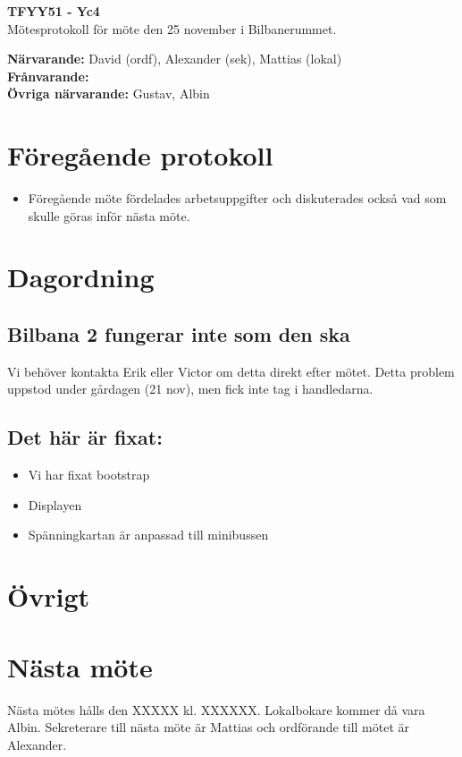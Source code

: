 \documentclass[11pt,a4paper]{article}
\begin{document}
    \begin{center}
        \textbf{\Large TFYY51 - Yc4} \\[0.2em]
        Mötesprotokoll för möte den 25 november i Bilbanerummet.
    \end{center}
    \vspace{1em}
    \textbf{Närvarande:} David (ordf), Alexander (sek), Mattias (lokal) \\[0.5em]
    \textbf{Frånvarande:}  \\[0.5em]  %
    \textbf{Övriga närvarande: }Gustav, Albin

    \section*{Föregående protokoll}
    \begin{itemize}
        \item Föregående möte fördelades arbetsuppgifter och diskuterades också vad som skulle göras inför nästa möte.\
    \end{itemize}

    \section*{Dagordning}
    \subsection*{Bilbana 2 fungerar inte som den ska}
	    Vi behöver kontakta Erik eller Victor om detta direkt efter mötet. Detta problem uppstod under gårdagen (21 nov), men fick inte tag i handledarna.
	    \subsection*{Det här är fixat:}
	     
	    \begin{itemize}
	    	\item Vi har fixat bootstrap
	    	\item Displayen
	    	\item Spänningkartan är anpassad till minibussen
	    \end{itemize}
    \section*{Övrigt}
    

    \section*{Nästa möte}
    Nästa mötes hålls den XXXXX kl. XXXXXX. Lokalbokare kommer då vara Albin. Sekreterare till nästa möte är Mattias och ordförande till mötet är Alexander.  
\end{document}
